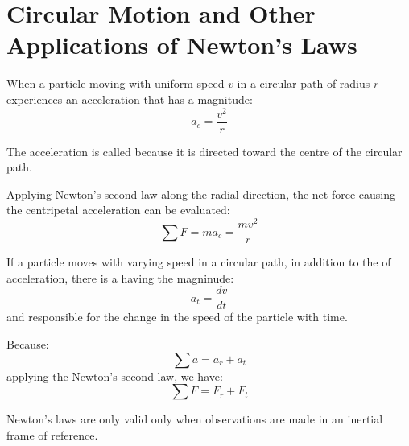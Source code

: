 \chapter{Circular Motion and Other Applications of Newton's Laws}
            \par When a particle moving with uniform speed $v$ in a circular path of radius $r$
            experiences an acceleration that has a magnitude:
            \begin{equation}
                a_{c} = \dfrac{v^2}{r}
            \end{equation}
            \par The acceleration is called  because it is directed
            toward the centre of the circular path.
            \par Applying Newton's second law along the radial direction, the net force causing
            the centripetal acceleration can be evaluated:
            \begin{equation}
                \sum F = ma_{c} = \dfrac{mv^2}{r}
            \end{equation}
    
        \par If a particle moves with varying speed in a circular path, in addition to the
         of acceleration, there is a  having
        the magninude:
        \begin{equation}
            a_{t} = \dfrac{dv}{dt}
        \end{equation}
        and responsible for the change in the speed of the particle with time.
        \par Because:
        \begin{equation}
            \sum a = a_{r} + a_{t}
        \end{equation}
        applying the Newton's second law, we have:
        \begin{equation}
            \sum F = F_{r} + F_{t}
        \end{equation}

            \par Newton's laws are only valid only when observations are made in an inertial
            frame of reference.

